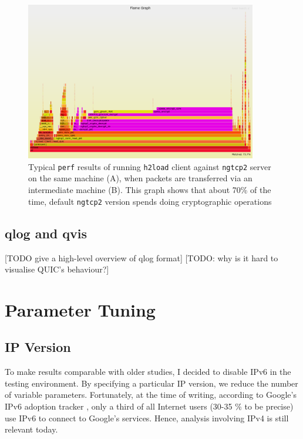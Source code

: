\documentclass[12pt,a4paper,twoside,openright]{report}
\begin{document}
    \begin{figure}[ht]
    \centering
    \includegraphics[width=0.9\textwidth]{figs/perf_results_of_h2load.png}
    \caption{Typical \texttt{perf} results of running \texttt{h2load} client against \texttt{ngtcp2} server on the same machine (A), when packets are transferred via an intermediate machine (B). This graph shows that about 70\% of the time, default \texttt{ngtcp2} version spends doing cryptographic operations} 
    \label{fig:perf_results_of_h2load}
    \end{figure}
    
\subsection{qlog and qvis}
[TODO give a high-level overview of qlog format]
[TODO: why is it hard to visualise QUIC's behaviour?]



\section{Parameter Tuning}

\subsection{IP Version}

To make results comparable with older studies, I decided to disable IPv6 in the testing environment.
By specifying a particular IP version, we reduce the number of variable parameters.
Fortunately, at the time of writing, according to Google's IPv6 adoption tracker \cite{IPv6_Adoption_Statistics}, only a third of all Internet users (30-35 \% to be precise) use IPv6 to connect to Google's services.
Hence, analysis involving IPv4 is still relevant today.
\end{document}
